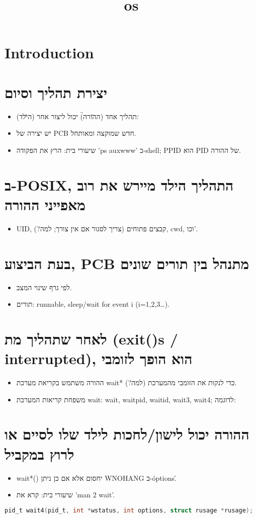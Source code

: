 \documentclass[12pt]{report}
\title{os}
\author{}
\begin{document}
\maketitle
\tableofcontents
\newpage

\section{Introduction}
  \section{יצירת תהליך וסיום}  \begin{itemize}  \item תהליך אחד (ה\"הורה\") יכול ליצור אחר (ה\"ילד\").  \item יש יצירה של PCB חדש שמוקצה ומאותחל.  \item שיעורי בית: הרץ את הפקודה 'ps auxwww' ב-shell; PPID הוא PID של ההורה.  \end{itemize}    \section{ב-POSIX, התהליך הילד מיירש את רוב מאפייני ההורה}  \begin{itemize}  \item UID, קבצים פתוחים (צריך לסגור אם אין צורך; למה?), cwd, וכו'.  \end{itemize}    \section{בעת הביצוע, PCB מתנהל בין תורים שונים}  \begin{itemize}  \item לפי גרף שינוי המצב.  \item תורים: runnable, sleep/wait for event i (i=1,2,3…).  \end{itemize}    \section{לאחר שתהליך מת (exit()s / interrupted), הוא הופך לזומבי}  \begin{itemize}  \item ההורה משתמש בקריאת מערכת wait* כדי לנקות את הזומבי מהמערכת (למה?).  \item משפחת קריאות המערכת wait: wait, waitpid, waitid, wait3, wait4; לדוגמה:  \end{itemize}    \section{ההורה יכול לישון/לחכות לילד שלו לסיים או לרוץ במקביל}  \begin{itemize}  \item wait*() יחסום אלא אם כן ניתן WNOHANG ב-\'options\'.  \item שיעורי בית: קרא את 'man 2 wait'.  \end{itemize}  
  \begin{lstlisting}[language=C]  pid_t wait4(pid_t, int *wstatus, int options, struct rusage *rusage);  \end{lstlisting}  
\end{document}
